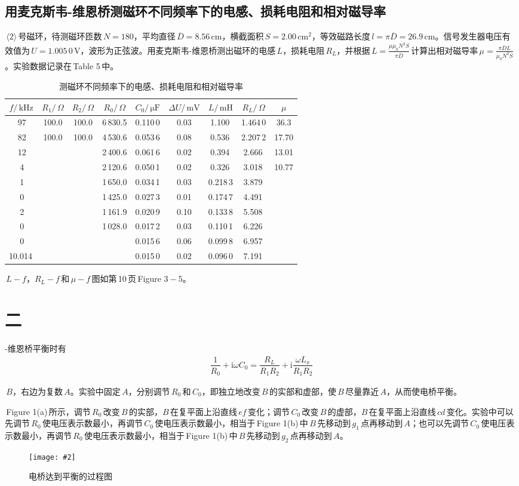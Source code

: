 \documentclass[a4paper,12pt]{article}
\newcommand{\im}{\mathrm{i}}
\newcommand{\cm}{\,\textrm{cm}}
\newcommand{\khz}{\,\textrm{kHz}}
\newcommand{\V}{\,\textrm{V}}
\newcommand{\mv}{\,\textrm{mV}}
\newcommand{\muf}{\,\mathrm{\mu F}}
\newcommand{\om}{\,\Omega}
\newcommand{\mh}{\,\textrm{mH}}
\newcommand{\ol}{\overline}
\newcommand{\sct}{\section}
\newcommand{\ssct}{\subsection}
\newcommand{\sj}{\quad\!\!\!\!\:}
\newcommand{\ed}{\:\;}
\newcommand{\eL}{\,\:\;}
\newcommand{\eT}{\;\;\;\;}
\newcommand{\bg}{\,Table\,\,}
\newcommand{\tp}{\,Figure\,\,}
\newcommand{\alg}[1]{\begin{align*}{#1}\end{align*}}
\newcommand{\ltb}[3]{\begin{longtable}{#1}
\caption{#2}
\centering
#3
\end{longtable}}
\newcommand{\fg}[3]{\begin{figure}[h]
\centering
\texttt{[image: \#2]}
\caption{#3}
\end{figure}}
\newcommand{\qm}{\cm^2}
\begin{document}
\begin{CJK*}{UTF8}{gbsn}
\begin{spacing}{1.2}
\ssct{用麦克斯韦-维恩桥测磁环不同频率下的电感、损耗电阻和相对磁导率}
$\,\langle2\rangle\,$号磁环，待测磁环匝数$\,N=180$，平均直径$\,\ol{D}=8.56\cm$，横截面积$\,S=2.00\qm$，等效磁路长度$\,l=\pi\ol{D}=26.9\cm$。信号发生器电压有效值为$\,U=1.005\,0\V$，波形为正弦波。用麦克斯韦-维恩桥测出磁环的电感$\,L$，损耗电阻$\,R_L$，并根据$\,L=\frac{\mu\mu_0N^2S}{\pi\ol{D}}\,$计算出相对磁导率$\,\mu=\frac{\pi\ol{D}L}{\mu_0N^2S}$。实验数据记录在\bg5\,中。
\ltb{|c|c|c|c|c|c|c|c|c|}{测磁环不同频率下的电感、损耗电阻和相对磁导率}{
\hline
$f/\khz$ & $R_1/\om$ & $R_2/\om$ & $R_0/\om$ & $C_0/\muf$ & $\Delta U/\mv$ & $L/\mh$ & $R_L/\om$ & $\mu$ \\
\hline
\endhead

\hline
\ed0.099\,97 & 100.0 & 100.0 & 6\,830.5 & 0.110\,0 & 0.03 & 1.100\eL & 1.464\,0 & 36.3\ed \\
\ed0.399\,82 & 100.0 & 100.0 & 4\,530.6 & 0.053\,6 & 0.08 & 0.536\eL & 2.207\,2 & 17.70 \\
\ed0.700\,12 & \ed80.0 & \ed80.0 & 2\,400.6 & 0.061\,6 & 0.02 & 0.394\eL & 2.666\eL & 13.01 \\
\ed1.001\,4\ed & \ed80.0 & \ed80.0 & 2\,120.6 & 0.050\,1 & 0.02 & 0.326\eL & 3.018\eL & 10.77 \\
\ed2.001\,1\ed & \ed80.0 & \ed80.0 & 1\,650.0 & 0.034\,1 & 0.03 & 0.218\,3 & 3.879\eL & \ed7.21 \\
\ed3.001\,0\ed & \ed80.0 & \ed80.0 & 1\,425.0 & 0.027\,3 & 0.01 & 0.174\,7 & 4.491\eL & \ed5.77 \\
\ed5.002\,2\ed & \ed80.0 & \ed80.0 & 1\,161.9 & 0.020\,9 & 0.10 & 0.133\,8 & 5.508\eL & \ed4.42 \\
\ed7.004\,0\ed & \ed80.0 & \ed80.0 & 1\,028.0 & 0.017\,2 & 0.03 & 0.110\,1 & 6.226\eL & \ed3.64 \\
\ed9.005\,0\ed & \ed80.0 & \ed80.0 & \eL920.0 & 0.015\,6 & 0.06 & 0.099\,8 & 6.957\eL & \ed3.30 \\
10.014\ed\eL & \ed80.0 & \ed80.0 & \eL890.0 & 0.015\,0 & 0.02 & 0.096\,0 & 7.191\eL & \ed3.17 \\
\hline
}
\par
{}$\,L-f$，$R_L-f\,$和$\,\mu-f\,$图如第\,10\,页\tp$3-5$。\newpage





\setcounter{section}{2}
\setcounter{subsection}{0}
\sct*{二}
-维恩桥平衡时有
\alg{
\dfrac{1}{R_0}+\im\omega C_0=\dfrac{R_L}{R_1R_2}+\im\dfrac{\omega L_x}{R_1R_2}
}
\par
{}$\,B$，右边为复数$\,A$。实验中固定$\,A$，分别调节$\,R_0\,$和$\,C_0$，即独立地改变$\,B\,$的实部和虚部，使$\,B\,$尽量靠近$\,A$，从而使电桥平衡。\par
{}\tp1(a)\,所示，调节$\,R_0\,$改变$\,B\,$的实部，$B\,$在复平面上沿直线$\,ef\,$变化；调节$\,C_0\,$改变$\,B\,$的虚部，$B\,$在复平面上沿直线$\,cd\,$变化。实验中可以先调节$\,R_0\,$使电压表示数最小，再调节$\,C_0\,$使电压表示数最小，相当于\tp1(b)\,中$\,B\,$先移动到$\,g_1\,$点再移动到$\,A$；也可以先调节$\,C_0\,$使电压表示数最小，再调节$\,R_0\,$使电压表示数最小，相当于\tp1(b)\,中$\,B\,$先移动到$\,g_2\,$点再移动到$\,A$。
\fg{1}{4.jpg}{电桥达到平衡的过程图}


\end{spacing}
\end{CJK*}
\end{document}
